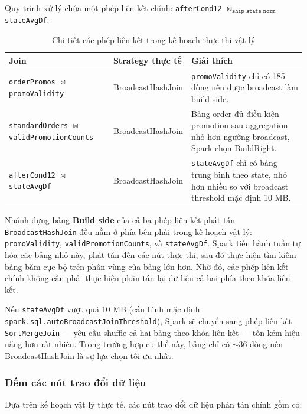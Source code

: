 Quy trình xử lý chứa một phép liên kết chính: \texttt{afterCond12} $\bowtie_{\texttt{ship\_state\_norm}}$ \texttt{stateAvgDf}.

\begin{table}[H]
\centering
\begin{tabular}{p{4cm}lp{6cm}}
\toprule
\textbf{Join} & \textbf{Strategy thực tế} & \textbf{Giải thích} \\
\midrule
\texttt{orderPromos} $\bowtie$ \texttt{promoValidity} & BroadcastHashJoin & \texttt{promoValidity} chỉ có 185 dòng nên được broadcast làm build side. \\
\texttt{standardOrders} $\bowtie$ \texttt{validPromotionCounts} & BroadcastHashJoin & Bảng order đủ điều kiện promotion sau aggregation nhỏ hơn ngưỡng broadcast, Spark chọn BuildRight. \\
\texttt{afterCond12} $\bowtie$ \texttt{stateAvgDf} & BroadcastHashJoin & \texttt{stateAvgDf} chỉ có bảng trung bình theo state, nhỏ hơn nhiều so với broadcast threshold mặc định 10 MB. \\
\bottomrule
\end{tabular}
\caption{Chi tiết các phép liên kết trong kế hoạch thực thi vật lý}
\label{tab:task2_1_joins}
\end{table}

Nhánh dựng bảng \textbf{Build side} của cả ba phép liên kết phát tán \texttt{BroadcastHashJoin} đều nằm ở phía bên phải trong kế hoạch vật lý: \texttt{promoValidity}, \texttt{validPromotionCounts}, và \texttt{stateAvgDf}. Spark tiến hành tuần tự hóa các bảng nhỏ này, phát tán đến các nút thực thi, sau đó thực hiện tìm kiếm bảng băm cục bộ trên phân vùng của bảng lớn hơn. Nhờ đó, các phép liên kết chính không cần phải thực hiện phân tán lại dữ liệu cả hai phía theo khóa liên kết.

Nếu \texttt{stateAvgDf} vượt quá 10 MB (cấu hình mặc định \texttt{spark.sql.autoBroadcastJoinThreshold}), Spark sẽ chuyển sang phép liên kết \texttt{SortMergeJoin} --- yêu cầu shuffle cả hai bảng theo khóa liên kết --- tốn kém hiệu năng hơn rất nhiều. Trong trường hợp cụ thể này, bảng chỉ có $\sim$36 dòng nên BroadcastHashJoin là sự lựa chọn tối ưu nhất.

\subsubsection{Đếm các nút trao đổi dữ liệu}

Dựa trên kế hoạch vật lý thực tế, các nút trao đổi dữ liệu phân tán chính gồm có:

